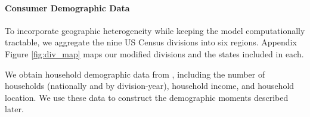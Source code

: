 \documentclass[11pt]{article}
\begin{document}

\paragraph{Consumer Demographic Data}
To incorporate geographic heterogeneity while keeping the model computationally tractable, we aggregate the nine US Census divisions into six regions. Appendix Figure \ref{fig:div_map} maps our modified divisions and the states included in each.

We obtain household demographic data from \cite{ruggles_ipums_2025}, including the number of households (nationally and by division-year), household income, and household location. We use these data to construct the demographic moments described later.

\end{document}
